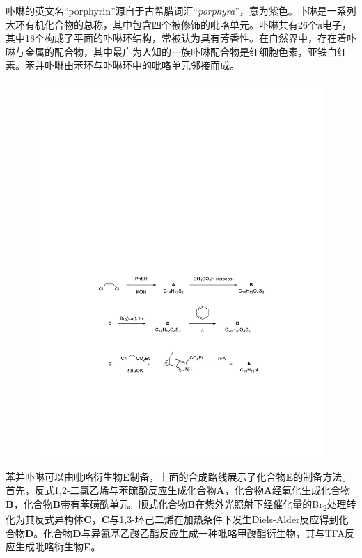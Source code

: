 卟啉的英文名``porphyrin''源自于古希腊词汇``\emph{porphyra}''，意为紫色。卟啉是一系列大环有机化合物的总称，其中包含四个被修饰的吡咯单元。卟啉共有26个π电子，其中18个构成了平面的卟啉环结构，常被认为具有芳香性。在自然界中，存在着卟啉与金属的配合物，其中最广为人知的一族卟啉配合物是红细胞色素，亚铁血红素。苯并卟啉由苯环与卟啉环中的吡咯单元邻接而成。

\begin{figure}[h!]
	\centering
	\includegraphics[width=11cm]{./pic/t11-1.pdf}
\end{figure}

苯并卟啉可以由吡咯衍生物\textbf{E}制备，上面的合成路线展示了化合物\textbf{E}的制备方法。首先，反式1,2-二氯乙烯与苯硫酚反应生成化合物\textbf{A}，化合物\textbf{A}经氧化生成化合物\textbf{B}，化合物\textbf{B}带有苯磺酰单元。顺式化合物\textbf{B}在紫外光照射下经催化量的Br\textsubscript{2}处理转化为其反式异构体\textbf{C}，\textbf{C}与1,3-环己二烯在加热条件下发生Diels-Alder反应得到化合物\textbf{D}。化合物\textbf{D}与异氰基乙酸乙酯反应生成一种吡咯甲酸酯衍生物，其与TFA反应生成吡咯衍生物\textbf{E}。


